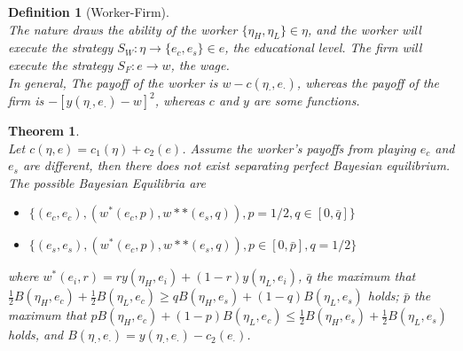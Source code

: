 \documentclass[12pt]{article}
\newtheorem{definition}{Definition}[section]
\newtheorem{theorem}{Theorem}[section]
\theoremstyle{definition}
\begin{document}
\begin{definition}[Worker-Firm]
\hfill\\\normalfont The nature draws the ability of the worker $\{\eta_H, \eta_L\}\in \eta$, and the worker will execute the strategy $S_W:\eta\to \{e_c, e_s\}\in e$, the educational level. The firm will execute the strategy $S_F: e\to w$, the wage.\\
In general, The payoff of the worker is $w-c(\eta_{\cdot}, e_{\cdot})$, whereas the payoff of the firm is $-[y(\eta_{\cdot}, e_{\cdot})-w]^2$, whereas $c$ and $y$ are some functions.
\end{definition}
\begin{theorem}\hfill\\\normalfont Let $c(\eta, e)=c_1(\eta)+c_2(e)$. Assume the worker's payoffs from playing $e_c$ and $e_s$ are different, then there does not exist separating perfect Bayesian equilibrium.\\
The possible Bayesian Equilibria are
\begin{itemize}
  \item $\{(e_c,e_c), (w^\ast(e_c,p), w*\ast(e_s,q)), p=1/2, q\in [0, \bar{q}]\}$
  \item $\{(e_s,e_s), (w^\ast(e_c,p), w*\ast(e_s,q)), p\in [0, \bar{p}], q=1/2\}$
\end{itemize}
where $w^\ast(e_i, r)=ry(\eta_H, e_i)+(1-r)y(\eta_L, e_i)$, $\bar{q}$ the maximum that $\frac{1}{2}B(\eta_H,e_c)+\frac{1}{2}B(\eta_L, e_c)\geq qB(\eta_H, e_s)+(1-q)B(\eta_L, e_s)$ holds; $\bar{p}$ the maximum that $pB(\eta_H,e_c)+(1-p)B(\eta_L, e_c)\leq \frac{1}{2}B(\eta_H, e_s)+\frac{1}{2}B(\eta_L, e_s)$ holds, and $B(\eta_{\cdot}, e_{\cdot})=y(\eta_{\cdot}, e_{\cdot})-c_2(e_{\cdot})$.
\end{theorem}
\clearpage
\end{document}
